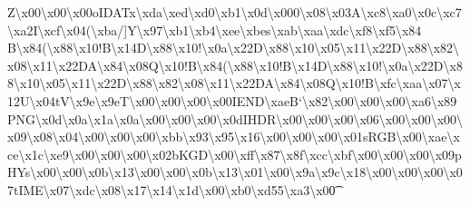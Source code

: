 Z\textbackslash{}x00\textbackslash{}x00\textbackslash{}x00o\+I\+D\+A\+Tx\textbackslash{}xda\textbackslash{}xed\textbackslash{}xd0\textbackslash{}xb1\textbackslash{}x0d\textbackslash{}x000\textbackslash{}x08\textbackslash{}x03\+A\textbackslash{}xc8\textbackslash{}xa0\textbackslash{}x0c\textbackslash{}xc7\textbackslash{}xa2\+I\textbackslash{}xcf\textbackslash{}x04(\textbackslash{}xba/\mbox{]}\+Y\textbackslash{}x97\textbackslash{}xb1\textbackslash{}xb4\textbackslash{}xee\textbackslash{}xbes\textbackslash{}xab\textbackslash{}xaa\textbackslash{}xdc\textbackslash{}xf8\textbackslash{}xf5\textbackslash{}x84 B\textbackslash{}x84(\textbackslash{}x88\textbackslash{}x10!\+B\textbackslash{}x14\+D\textbackslash{}x88\textbackslash{}x10!\textbackslash{}x0a\textbackslash{}x22\+D\textbackslash{}x88\textbackslash{}x10\textbackslash{}x05\textbackslash{}x11\textbackslash{}x22\+D\textbackslash{}x88\textbackslash{}x82\textbackslash{}x08\textbackslash{}x11\textbackslash{}x22\+D\+A\textbackslash{}x84\textbackslash{}x08\+Q\textbackslash{}x10!\+B\textbackslash{}x84(\textbackslash{}x88\textbackslash{}x10!\+B\textbackslash{}x14\+D\textbackslash{}x88\textbackslash{}x10!\textbackslash{}x0a\textbackslash{}x22\+D\textbackslash{}x88\textbackslash{}x10\textbackslash{}x05\textbackslash{}x11\textbackslash{}x22\+D\textbackslash{}x88\textbackslash{}x82\textbackslash{}x08\textbackslash{}x11\textbackslash{}x22\+D\+A\textbackslash{}x84\textbackslash{}x08\+Q\textbackslash{}x10!\+B\textbackslash{}xfc\textbackslash{}xaa\textbackslash{}x07\textbackslash{}x12\+U\textbackslash{}x04t\+V\textbackslash{}x9e\textbackslash{}x9e\+T\textbackslash{}x00\textbackslash{}x00\textbackslash{}x00\textbackslash{}x00\+I\+E\+N\+D\textbackslash{}xae\+B`\textbackslash{}x82\textbackslash{}x00\textbackslash{}x00\textbackslash{}x00\textbackslash{}xa6\textbackslash{}x89\+P\+N\+G\textbackslash{}x0d\textbackslash{}x0a\textbackslash{}x1a\textbackslash{}x0a\textbackslash{}x00\textbackslash{}x00\textbackslash{}x00\textbackslash{}x0d\+I\+H\+D\+R\textbackslash{}x00\textbackslash{}x00\textbackslash{}x00\textbackslash{}x06\textbackslash{}x00\textbackslash{}x00\textbackslash{}x00\textbackslash{}x09\textbackslash{}x08\textbackslash{}x04\textbackslash{}x00\textbackslash{}x00\textbackslash{}x00\textbackslash{}xbb\textbackslash{}x93\textbackslash{}x95\textbackslash{}x16\textbackslash{}x00\textbackslash{}x00\textbackslash{}x00\textbackslash{}x01s\+R\+G\+B\textbackslash{}x00\textbackslash{}xae\textbackslash{}xce\textbackslash{}x1c\textbackslash{}xe9\textbackslash{}x00\textbackslash{}x00\textbackslash{}x00\textbackslash{}x02b\+K\+G\+D\textbackslash{}x00\textbackslash{}xff\textbackslash{}x87\textbackslash{}x8f\textbackslash{}xcc\textbackslash{}xbf\textbackslash{}x00\textbackslash{}x00\textbackslash{}x00\textbackslash{}x09p\+H\+Ys\textbackslash{}x00\textbackslash{}x00\textbackslash{}x0b\textbackslash{}x13\textbackslash{}x00\textbackslash{}x00\textbackslash{}x0b\textbackslash{}x13\textbackslash{}x01\textbackslash{}x00\textbackslash{}x9a\textbackslash{}x9c\textbackslash{}x18\textbackslash{}x00\textbackslash{}x00\textbackslash{}x00\textbackslash{}x07t\+I\+M\+E\textbackslash{}x07\textbackslash{}xdc\textbackslash{}x08\textbackslash{}x17\textbackslash{}x14\textbackslash{}x1d\textbackslash{}x00\textbackslash{}xb0\textbackslash{}xd55\textbackslash{}xa3\textbackslash{}x00\t